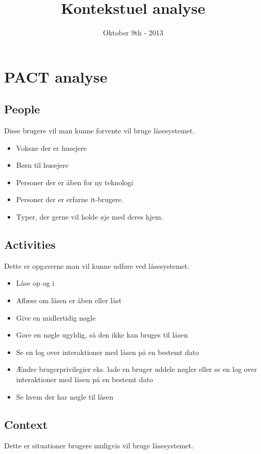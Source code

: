 \documentclass[a4paper,12pt]{article}
\title{Kontekstuel analyse}
\author{}
\date{Oktober 9th - 2013}
\begin{document}
\maketitle %
\tableofcontents %
\newpage

\clearpage %

\section{PACT analyse}
\subsection{People}
Disse brugere vil man kunne forvente vil bruge låsesystemet.

\begin{itemize}
    \item Voksne der er husejere
    \item Børn til husejere
    \item Personer der er åben for ny teknologi
    \item Personer der er erfarne it-brugere.
    \item Typer, der gerne vil holde øje med deres hjem.
\end{itemize}

\subsection{Activities}
Dette er opgaverne man vil kunne udføre ved låsesystemet.

\begin{itemize}
    \item Låse op og i
    \item Aflæse om låsen er åben eller låst
    \item Give en midlertidig nøgle
    \item Gøre en nøgle ugyldig, så den ikke kan bruges til låsen
    \item Se en log over interaktioner med låsen på en bestemt dato
    \item Ændre brugerprivilegier eks. lade en bruger uddele nøgler eller se en log over interaktioner med låsen på en bestemt dato
    \item Se hvem der har nøgle til låsen
\end{itemize}


\subsection{Context}
Dette er situationer brugere muligvis vil bruge låsesystemet.
\end{document}
